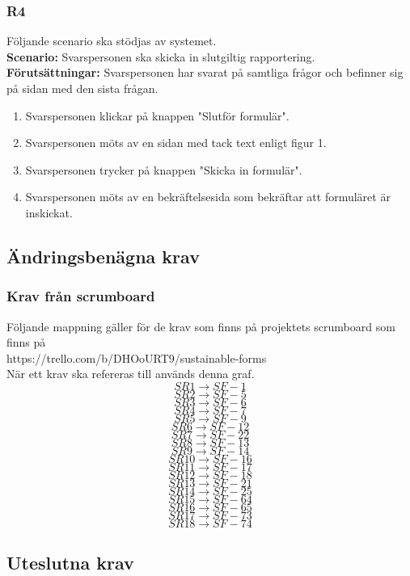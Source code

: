 \documentclass{article}
\begin{document}
        \subsubsection*{R4}
    Följande scenario ska stödjas av systemet.
        \\
       \indent \textbf{Scenario:} Svarspersonen ska skicka in slutgiltig rapportering.
        \\
       \indent \textbf{Förutsättningar:} Svarspersonen har svarat på samtliga frågor och befinner sig på sidan med den sista frågan.
            \begin{enumerate}
                \item Svarspersonen klickar på knappen "Slutför formulär".
                \item Svarspersonen möts av en sidan med tack text enligt figur 1.
                \item Svarspersonen trycker på knappen "Skicka in formulär".
                \item  Svarspersonen möts av en bekräftelsesida som bekräftar att formuläret är inskickat.
            \end{enumerate}

\subsection*{Ändringsbenägna krav}

\subsubsection*{Krav från scrumboard}
Följande mappning gäller för de krav som finns på projektets scrumboard som finns på \\
https://trello.com/b/DHOoURT9/sustainable-forms
\\
När ett krav ska refereras till används denna graf.\\
$$SR1\rightarrow SF-1$$
$$SR2\rightarrow SF-5$$
$$SR3\rightarrow SF-6$$
$$SR4\rightarrow SF-7$$
$$SR5\rightarrow SF-9$$
$$SR6\rightarrow SF-12$$
$$SR7\rightarrow SF-22$$
$$SR8\rightarrow SF-13$$
$$SR9\rightarrow SF-14$$
$$SR10\rightarrow SF-16$$
$$SR11\rightarrow SF-17$$
$$SR12\rightarrow SF-18$$
$$SR13\rightarrow SF-21$$
$$SR14\rightarrow SF-25$$
$$SR15\rightarrow SF-64$$
$$SR16\rightarrow SF-65$$
$$SR17\rightarrow SF-73$$
$$SR18\rightarrow SF-74$$

    \subsection*{Uteslutna krav}
    
\end{document}
